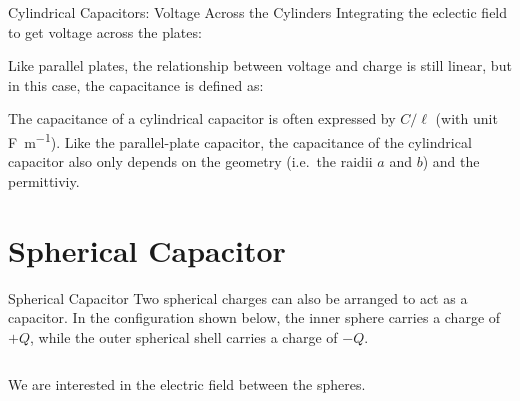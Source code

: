 \documentclass[12pt,aspectratio=169]{beamer}
\begin{document}
\begin{frame}{Cylindrical Capacitors: Voltage Across the Cylinders}
  Integrating the eclectic field to get voltage across the plates:


  Like parallel plates, the relationship between voltage and charge is still
  linear, but in this case, the capacitance is defined as:

  \eq{-.1in}{
    C=\frac Q{\Delta V}=\frac{2\pi\ell\epsilon_0}{\ln(b/a)}
    \quad\to\quad
    \boxed{\frac C\ell=\frac{2\pi\epsilon_0}{\ln(b/a)}}%
  }

  The capacitance of a cylindrical capacitor is often expressed by $C/\ell$
  (with unit \si{\farad\per\metre}). Like the parallel-plate capacitor, the
  capacitance of the cylindrical capacitor also only depends on the geometry
  (i.e.\ the raidii $a$ and $b$) and the permittiviy.
\end{frame}



\section{Spherical Capacitor}

\begin{frame}{Spherical Capacitor}
  Two spherical charges can also be arranged to act as a capacitor. In the
  configuration shown below, the inner sphere carries a charge of $+Q$, while
  the outer spherical shell carries a charge of $-Q$.
  \begin{columns}[T]
    \centering
    
  \end{columns}

  We are interested in the electric field between the spheres.
\end{frame}
\end{document}
